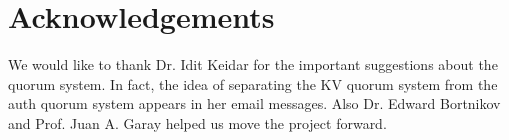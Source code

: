 \section*{Acknowledgements}
We would like to thank Dr. Idit Keidar for the important suggestions
about the quorum system. In fact, the idea of separating the KV quorum
system from the auth quorum system appears in her email messages. Also
Dr. Edward Bortnikov and Prof. Juan A. Garay helped us move the
project forward.
